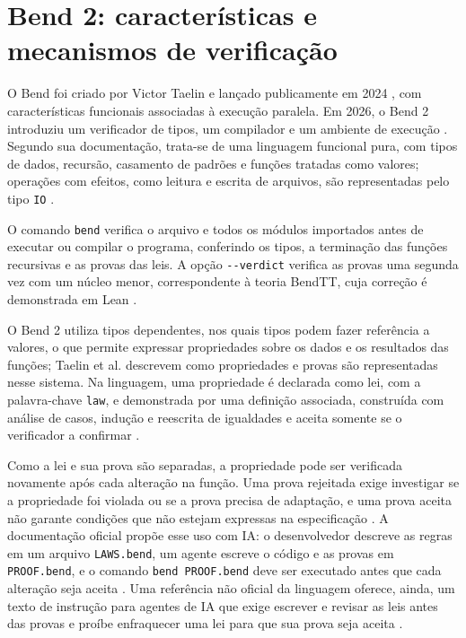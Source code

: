 \section{Bend 2: características e mecanismos de verificação}

O Bend foi criado por Victor Taelin \cite{BendRepo} e lançado publicamente em 2024 \cite{Bend1Repo}, com características funcionais associadas à execução paralela. Em 2026, o Bend 2 introduziu um verificador de tipos, um compilador e um ambiente de execução \cite{BendRepo}. Segundo sua documentação, trata-se de uma linguagem funcional pura, com tipos de dados, recursão, casamento de padrões e funções tratadas como valores; operações com efeitos, como leitura e escrita de arquivos, são representadas pelo tipo \texttt{IO} \cite{BendGuide}.

O comando \texttt{bend} verifica o arquivo e todos os módulos importados antes de executar ou compilar o programa, conferindo os tipos, a terminação das funções recursivas e as provas das leis. A opção \texttt{-{}-verdict} verifica as provas uma segunda vez com um núcleo menor, correspondente à teoria BendTT, cuja correção é demonstrada em Lean \cite{BendGuide,BendTT}.

O Bend 2 utiliza tipos dependentes, nos quais tipos podem fazer referência a valores, o que permite expressar propriedades sobre os dados e os resultados das funções; Taelin et al. \cite{BendTT} descrevem como propriedades e provas são representadas nesse sistema. Na linguagem, uma propriedade é declarada como lei, com a palavra-chave \texttt{law}, e demonstrada por uma definição associada, construída com análise de casos, indução e reescrita de igualdades e aceita somente se o verificador a confirmar \cite{BendGuide}.

Como a lei e sua prova são separadas, a propriedade pode ser verificada novamente após cada alteração na função. Uma prova rejeitada exige investigar se a propriedade foi violada ou se a prova precisa de adaptação, e uma prova aceita não garante condições que não estejam expressas na especificação \cite{BendGuide}. A documentação oficial propõe esse uso com IA: o desenvolvedor descreve as regras em um arquivo \texttt{LAWS.bend}, um agente escreve o código e as provas em \texttt{PROOF.bend}, e o comando \texttt{bend PROOF.bend} deve ser executado antes que cada alteração seja aceita \cite{BendRepo}. Uma referência não oficial da linguagem oferece, ainda, um texto de instrução para agentes de IA que exige escrever e revisar as leis antes das provas e proíbe enfraquecer uma lei para que sua prova seja aceita \cite{BendAgents}.

